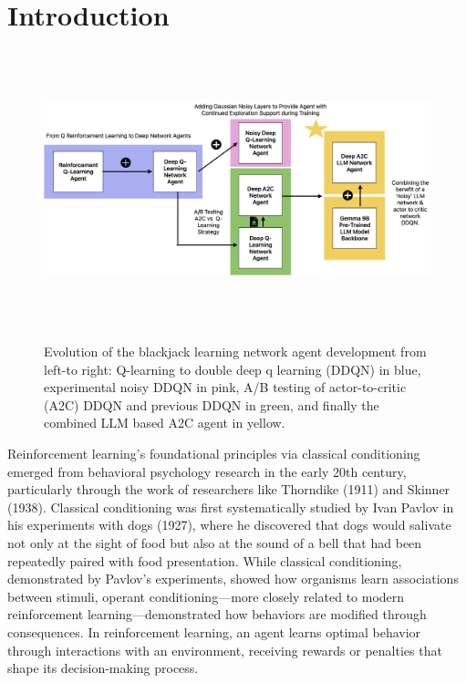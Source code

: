\documentclass[compsoc]{IEEEtran}
\begin{document}
\IEEEpeerreviewmaketitle



\section{Introduction}\label{sec:introduction}

\begin{figure}[h]
\centering
{\includegraphics[width=\textwidth, height=8cm]{./fig/rl_project_architectures.png}}
\caption{Evolution of the blackjack learning network agent development from left-to right: Q-learning to double deep q learning (DDQN) in blue, experimental noisy DDQN in pink, A/B testing of actor-to-critic (A2C) DDQN and previous DDQN in green, and finally the combined LLM based A2C agent in yellow.}
\end{figure}


Reinforcement learning's foundational principles via classical conditioning emerged from behavioral psychology research in the early 20th century, particularly through the work of researchers like Thorndike (1911) and Skinner (1938). Classical conditioning was first systematically studied by Ivan Pavlov in his experiments with dogs (1927), where he discovered that dogs would salivate not only at the sight of food but also at the sound of a bell that had been repeatedly paired with food presentation. While classical conditioning, demonstrated by Pavlov's experiments, showed how organisms learn associations between stimuli, operant conditioning—more closely related to modern reinforcement learning—demonstrated how behaviors are modified through consequences. In reinforcement learning, an agent learns optimal behavior through interactions with an environment, receiving rewards or penalties that shape its decision-making process. 
\end{document}
